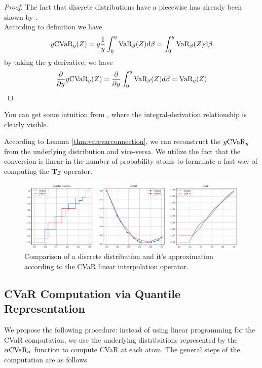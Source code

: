 \begin{proof}
The fact that discrete distributions have a piecewise has already been shown by \citet{rockafellar2000optimization}.
\\
According to definition  we have
\begin{equation*}
y\text{CVaR}_y(Z) = y\dfrac{1}{y}\int_0^y \text{VaR}_\beta(Z) \text{d} \beta = \int_0^y \text{VaR}_\beta(Z) \text{d} \beta
\end{equation*}
by taking the $y$ derivative, we have
\begin{equation*}
\dfrac{\partial}{\partial y} y \text{CVaR}_y(Z) = \dfrac{\partial}{\partial y} \int_0^y \text{VaR}_\beta(Z) d\beta = \text{VaR}_y(Z)
\end{equation*}
\end{proof}

You can get some intuition from , where the integral-derivation relationship is clearly visible.

According to Lemma \ref{thm:varcvarconnection}, we can reconstruct the $y\text{CVaR}_y$ from the underlying distribution and vice-versa. We utilize the fact that the conversion is linear in the number of probability atoms to formulate a fast way of computing the $\mathbf{T}_{\mathcal{I}}$ operator.

\begin{figure}
\center
\includegraphics[width=\linewidth]{gfx/cvar_visualized.pdf}
\caption{Comparison of a discrete distribution and it's approximation according to the CVaR linear interpolation operator.}
\label{fig:cvarvisual}
\end{figure}

\subsection{CVaR Computation via Quantile Representation}

We propose the following procedure: instead of using linear programming for the CVaR computation, we use the underlying distributions represented by the $\alpha \text{CVaR}_\alpha$ function to compute CVaR at each atom. The general steps of the computation are as follows

